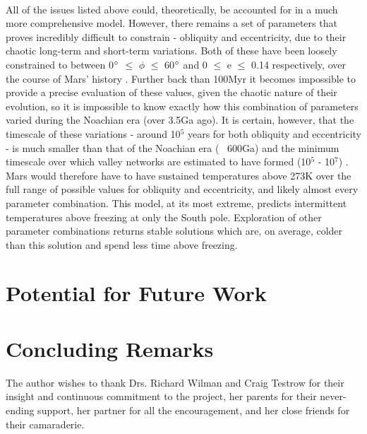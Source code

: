 \documentclass[12pt,onecolumn]{revtex4-2}    %
\begin{document}
\

All of the issues listed above could, theoretically, be accounted for in a much more comprehensive model. However, there remains a set of parameters that proves incredibly difficult to constrain - obliquity and eccentricity, due to their chaotic long-term and short-term variations. Both of these have been loosely constrained to between 0$\degree$ $\leq$ $\phi$ $\leq$ 60$\degree$ and 0 $\leq$ e $\leq$ 0.14 respectively, over the course of Mars' history \cite{L04}. Further back than 100Myr it becomes impossible to provide a precise evaluation of these values, given the chaotic nature of their evolution, so it is impossible to know exactly how this combination of parameters varied during the Noachian era (over 3.5Ga ago). It is certain, however, that the timescale of these variations - around 10$^5$ years for both obliquity and eccentricity - is much smaller than that of the Noachian era (~ 600Ga) and the minimum timescale over which valley networks are estimated to have formed (10$^5$ - 10$^7$) \cite{HHT11}. Mars would therefore have to have sustained temperatures above 273K over the full range of possible values for obliquity and eccentricity, and likely almost every parameter combination. This model, at its most extreme, predicts intermittent temperatures above freezing at only the South pole. Exploration of other parameter combinations returns stable solutions which are, on average, colder than this solution and spend less time above freezing.

\section{Potential for Future Work}

\section{Concluding Remarks}

\begin{acknowledgments}
The author wishes to thank Drs. Richard Wilman and Craig Testrow for their insight and continuous commitment to the project, her parents for their never-ending support, her partner for all the encouragement, and her close friends for their camaraderie.
\end{acknowledgments}
\end{document}
